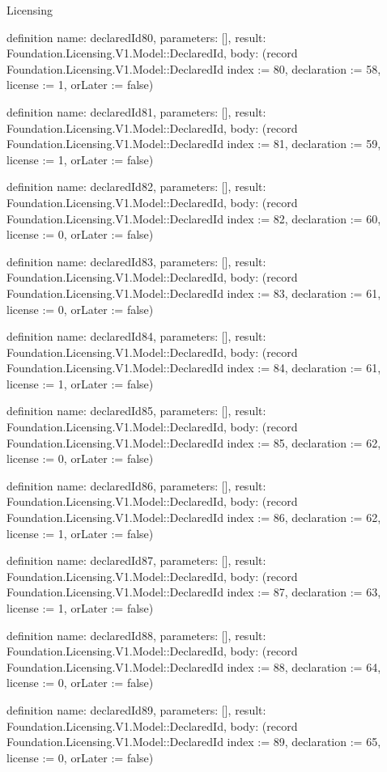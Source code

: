 \begin{lexlean}{Licensing}
\begin{semanticmodule}
definition{
  name: declaredId80,
  parameters: [],
  result: Foundation.Licensing.V1.Model::DeclaredId,
  body: (record Foundation.Licensing.V1.Model::DeclaredId {index := 80, declaration := 58, license := 1, orLater := false})
}

definition{
  name: declaredId81,
  parameters: [],
  result: Foundation.Licensing.V1.Model::DeclaredId,
  body: (record Foundation.Licensing.V1.Model::DeclaredId {index := 81, declaration := 59, license := 1, orLater := false})
}

definition{
  name: declaredId82,
  parameters: [],
  result: Foundation.Licensing.V1.Model::DeclaredId,
  body: (record Foundation.Licensing.V1.Model::DeclaredId {index := 82, declaration := 60, license := 0, orLater := false})
}

definition{
  name: declaredId83,
  parameters: [],
  result: Foundation.Licensing.V1.Model::DeclaredId,
  body: (record Foundation.Licensing.V1.Model::DeclaredId {index := 83, declaration := 61, license := 0, orLater := false})
}

definition{
  name: declaredId84,
  parameters: [],
  result: Foundation.Licensing.V1.Model::DeclaredId,
  body: (record Foundation.Licensing.V1.Model::DeclaredId {index := 84, declaration := 61, license := 1, orLater := false})
}

definition{
  name: declaredId85,
  parameters: [],
  result: Foundation.Licensing.V1.Model::DeclaredId,
  body: (record Foundation.Licensing.V1.Model::DeclaredId {index := 85, declaration := 62, license := 0, orLater := false})
}

definition{
  name: declaredId86,
  parameters: [],
  result: Foundation.Licensing.V1.Model::DeclaredId,
  body: (record Foundation.Licensing.V1.Model::DeclaredId {index := 86, declaration := 62, license := 1, orLater := false})
}

definition{
  name: declaredId87,
  parameters: [],
  result: Foundation.Licensing.V1.Model::DeclaredId,
  body: (record Foundation.Licensing.V1.Model::DeclaredId {index := 87, declaration := 63, license := 1, orLater := false})
}

definition{
  name: declaredId88,
  parameters: [],
  result: Foundation.Licensing.V1.Model::DeclaredId,
  body: (record Foundation.Licensing.V1.Model::DeclaredId {index := 88, declaration := 64, license := 0, orLater := false})
}

definition{
  name: declaredId89,
  parameters: [],
  result: Foundation.Licensing.V1.Model::DeclaredId,
  body: (record Foundation.Licensing.V1.Model::DeclaredId {index := 89, declaration := 65, license := 0, orLater := false})
}


\end{semanticmodule}
\end{lexlean}
